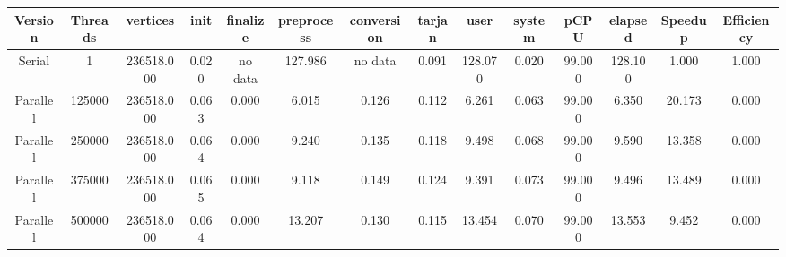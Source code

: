 \begin{tabular}{|c|c|c|c|c|c|c|c|c|c|c|c|c|c|}
\toprule
 Version &  Threads &   vertices &  init & finalize &  preprocess & conversion &  tarjan &    user &  system &   pCPU &  elapsed &  Speedup &  Efficiency \\
\midrule
  Serial &        1 & 236518.000 & 0.020 &  no data &     127.986 &    no data &   0.091 & 128.070 &   0.020 & 99.000 &  128.100 &    1.000 &       1.000 \\
Parallel &   125000 & 236518.000 & 0.063 &    0.000 &       6.015 &      0.126 &   0.112 &   6.261 &   0.063 & 99.000 &    6.350 &   20.173 &       0.000 \\
Parallel &   250000 & 236518.000 & 0.064 &    0.000 &       9.240 &      0.135 &   0.118 &   9.498 &   0.068 & 99.000 &    9.590 &   13.358 &       0.000 \\
Parallel &   375000 & 236518.000 & 0.065 &    0.000 &       9.118 &      0.149 &   0.124 &   9.391 &   0.073 & 99.000 &    9.496 &   13.489 &       0.000 \\
Parallel &   500000 & 236518.000 & 0.064 &    0.000 &      13.207 &      0.130 &   0.115 &  13.454 &   0.070 & 99.000 &   13.553 &    9.452 &       0.000 \\
\bottomrule
\end{tabular}
